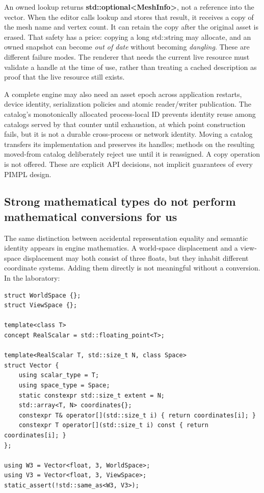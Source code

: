 An owned lookup returns \textbf{std::optional\textless MeshInfo\textgreater{}}, not a reference into the vector. When the editor calls lookup and stores that result, it receives a copy of the mesh name and vertex count. It can retain the copy after the original asset is erased. That safety has a price: copying a long std::string may allocate, and an owned snapshot can become \emph{out of date} without becoming \emph{dangling}. These are different failure modes. The renderer that needs the current live resource must validate a handle at the time of use, rather than treating a cached description as proof that the live resource still exists.

A complete engine may also need an asset epoch across application restarts, device identity, serialization policies and atomic reader/writer publication. The catalog's monotonically allocated process-local ID prevents identity reuse among catalogs served by that counter until exhaustion, at which point construction fails, but it is not a durable cross-process or network identity. Moving a catalog transfers its implementation and preserves its handles; methods on the resulting moved-from catalog deliberately reject use until it is reassigned. A copy operation is not offered. These are explicit API decisions, not implicit guarantees of every PIMPL design.

\subsection{Strong mathematical types do not perform mathematical conversions for us}\label{05-engine-i-ch007-strong-mathematical-types-do-not-perform-mathematical-conversions-for-us}

The same distinction between accidental representation equality and semantic identity appears in engine mathematics. A world-space displacement and a view-space displacement may both consist of three floats, but they inhabit different coordinate systems. Adding them directly is not meaningful without a conversion. In the laboratory:

\begin{verbatim}
struct WorldSpace {};
struct ViewSpace {};

template<class T>
concept RealScalar = std::floating_point<T>;

template<RealScalar T, std::size_t N, class Space>
struct Vector {
    using scalar_type = T;
    using space_type = Space;
    static constexpr std::size_t extent = N;
    std::array<T, N> coordinates{};
    constexpr T& operator[](std::size_t i) { return coordinates[i]; }
    constexpr T operator[](std::size_t i) const { return coordinates[i]; }
};

using W3 = Vector<float, 3, WorldSpace>;
using V3 = Vector<float, 3, ViewSpace>;
static_assert(!std::same_as<W3, V3>);
\end{verbatim}

